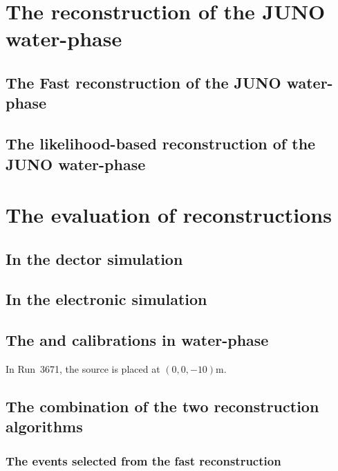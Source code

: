 \section{The reconstruction of the JUNO water-phase}

\subsection{The Fast reconstruction of the JUNO water-phase}
\subsection{The likelihood-based reconstruction of the JUNO water-phase}

\section{The evaluation of reconstructions}
\subsection{In the dector simulation}
\subsection{In the electronic simulation}
\subsection{The  and  calibrations in water-phase}
In Run~3671, the  source is placed at $(0,0,-10)$\si{m}.

\subsection{The combination of the two reconstruction algorithms}
\subsubsection{The events selected from the fast reconstruction}
